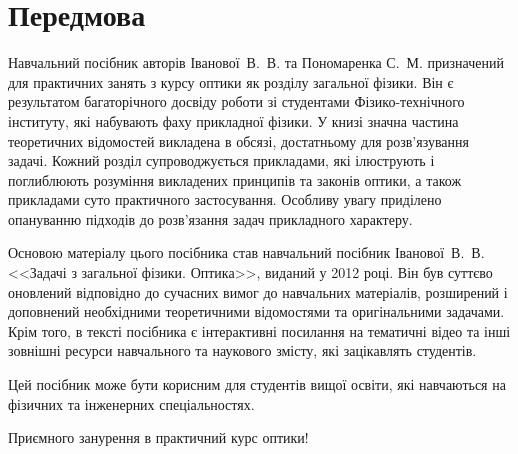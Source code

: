
\introtrue
\chapter*{Передмова}



Навчальний посібник авторів Іванової~В.~В. та Пономаренка С.~М. призначений для практичних занять з курсу оптики як розділу загальної фізики. Він є результатом багаторічного досвіду роботи зі студентами Фізико-технічного інституту, які набувають фаху прикладної фізики. У книзі значна частина теоретичних відомостей викладена в обсязі, достатньому для розв'язування задачі. Кожний розділ супроводжується прикладами, які ілюструють і поглиблюють розуміння викладених принципів та законів оптики, а також прикладами суто практичного застосування. Особливу увагу приділено опануванню підходів до розв’язання задач прикладного характеру.

Основою матеріалу цього посібника став навчальний посібник Іванової~В.~В. <<Задачі з загальної фізики. Оптика>>, виданий у 2012 році. Він був суттєво оновлений відповідно до сучасних вимог до навчальних матеріалів, розширений і доповнений необхідними теоретичними відомостями та оригінальними задачами. Крім того, в тексті посібника є інтерактивні посилання на тематичні відео та інші зовнішні ресурси навчального та наукового змісту, які зацікавлять студентів.

Цей посібник може бути корисним для студентів вищої освіти, які навчаються на фізичних та інженерних спеціальностях.

Приємного занурення в практичний курс оптики!
%
\introfalse





